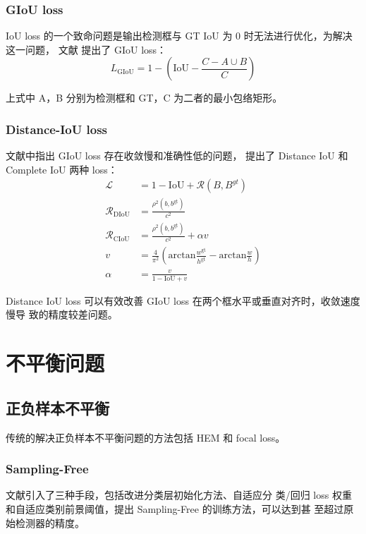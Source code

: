 \subsubsection{GIoU loss}
IoU loss 的一个致命问题是输出检测框与 GT IoU 为 0 时无法进行优化，为解决这一问题，
文献 提出了 GIoU loss：
\begin{equation}
  L_{\mathrm{GIoU}} = 1 - \left( \mathrm{IoU} - \frac{C - A \cup B}{C} \right)
\end{equation}

上式中 A，B 分别为检测框和 GT，C 为二者的最小包络矩形。

\subsubsection{Distance-IoU loss}
文献中指出 GIoU loss 存在收敛慢和准确性低的问题，
提出了 Distance IoU 和 Complete IoU 两种 loss：
\begin{align}
  \mathcal{L} & = 1 - \mathrm{IoU} + \mathcal{R}(B, B^{gt}) \\
  \mathcal{R}_{\mathrm{DIoU}} & = \frac{\rho^2(b, b^{\mathrm{gt}})}{c^2} \\
  \mathcal{R}_{\mathrm{CIoU}} & = \frac{\rho^2(b, b^{\mathrm{gt}})}{c^2} + \alpha v \\
  v & = \frac{4}{\pi^2}\left( \mathrm{arctan}\frac{w^{\mathrm{gt}}}{h^{\mathrm{gt}}} - \mathrm{arctan}\frac{w}{h} \right) \\
  \alpha & = \frac{v}{1 - \mathrm{IoU} + v}
\end{align}

Distance IoU loss 可以有效改善 GIoU loss 在两个框水平或垂直对齐时，收敛速度慢导
致的精度较差问题。

\section{不平衡问题}
\subsection{正负样本不平衡}

传统的解决正负样本不平衡问题的方法包括 HEM 和 focal loss。

\subsubsection{Sampling-Free}
文献引入了三种手段，包括改进分类层初始化方法、自适应分
类/回归 loss 权重和自适应类别前景阈值，提出 Sampling-Free 的训练方法，可以达到甚
至超过原始检测器的精度。

